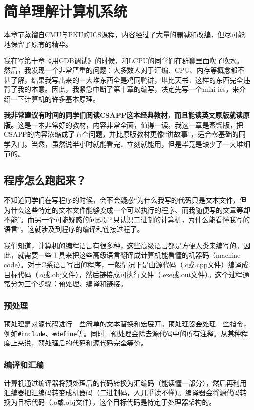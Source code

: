 \documentclass[../main.tex]{subfiles}
\begin{document}
\chapter{简单理解计算机系统}

\begin{flushright}
  { \kaishu 本章节蒸馏自CMU与PKU的ICS课程，内容经过了大量的删减和改编，但尽可能地保留了原有的精华。}
\end{flushright}

我在写第十章《用GDB调试》的时候，和LCPU的同学们在群聊里面吹了吹水。然后，我发现一个非常严重的问题：大多数人对于汇编、CPU、内存等概念都不甚了解，结果我写出来的一大堆东西全是鸡同鸭讲，堪比天书，这样的东西完全违背了我的本意。因此，我紧急中断了第十章的编写，决定先写一个mini ics，来介绍一下计算机的许多基本原理。

\textbf{我非常建议有时间的同学们阅读CSAPP这本经典教材，而且能读英文原版就读原版。}这是一本非常好的教材，内容非常全面，值得一读。我这一章是蒸馏版，把CSAPP的内容浓缩成了五个问题，并比原版教材更像“讲故事”，适合零基础的同学入门。当然，虽然说半小时就能看完、立刻就能用，但是毕竟是缺少了一大堆细节的。

\section{程序怎么跑起来？}

不知道同学们在写程序的时候，会不会疑惑“为什么我写的代码只是文本文件，但为什么这些特定的文本文件能够变成一个可以执行的程序、而我随便写的文章等却不能”。而另一个可能疑惑的问题是“只认识二进制的计算机，为什么能看懂我写的语言”。这就涉及到程序的编译和链接过程了。

我们知道，计算机的编程语言有很多种，这些高级语言都是方便人类来编写的。因此，就需要一些工具来把这些高级语言翻译成计算机能看懂的机器码（machine code）。对于C系语言写出的程序，一般情况下是由源代码（.c或.cpp文件）编译成目标代码（.o或.obj文件），然后链接成可执行文件（.exe或.out文件）。这个过程通常分为三个步骤：预处理、编译和链接。

\subsection{预处理}
预处理是对源代码进行一些简单的文本替换和宏展开。预处理器会处理一些指令，例如\texttt{\#include}、\texttt{\#define}等。同时，预处理会除去源代码中的所有注释。从某种程度上来说，预处理后的代码和源代码完全等价。

\subsection{编译和汇编}
计算机通过编译器将预处理后的代码转换为汇编码（能读懂一部分），然后再利用汇编器把汇编码转变成机器码（二进制码，人几乎读不懂）。编译器会将源代码转换为目标代码（.o或.obj文件），这个目标代码是特定于处理器架构的。
\end{document}
